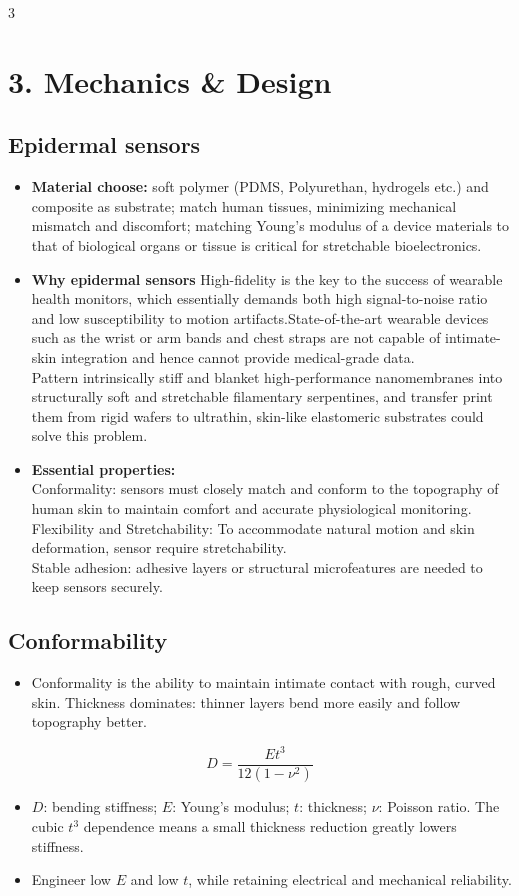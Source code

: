 \documentclass[10pt,a4paper]{ctexart}
\newcommand{\key}[1]{\textbf{#1}}
\newcommand{\formula}[1]{%
  \par\vspace{1pt}\begingroup
  \setlength{\abovedisplayskip}{0pt}\setlength{\belowdisplayskip}{0pt}
  \[#1\]\endgroup\vspace{1pt}}
\begin{document}
\begin{multicols*}{3}
\section{3. Mechanics \& Design}
\subsection{Epidermal sensors}
\begin{itemize}
  \item \key{Material choose:} soft polymer (PDMS, Polyurethan, hydrogels etc.)
  and composite as substrate; match human tissues, minimizing mechanical
  mismatch and discomfort; matching Young's modulus of a device materials to that of 
  biological organs or tissue is critical for stretchable bioelectronics.
  \item \key{Why epidermal sensors} High-fidelity is the key to the success 
  of wearable health monitors, which essentially demands both high signal-to-noise 
  ratio and low susceptibility to motion artifacts.State-of-the-art wearable devices 
  such as the wrist or arm bands and chest straps are not capable of intimate-skin 
  integration and hence cannot provide medical-grade data.\\
  Pattern intrinsically stiff and blanket high-performance nanomembranes into 
  structurally soft and stretchable filamentary serpentines, and transfer print them 
  from rigid wafers to ultrathin, skin-like elastomeric substrates could solve this problem.
  \item \key{Essential properties:}\\
  Conformality: sensors must closely match and conform to the topography of 
  human skin to maintain comfort and accurate physiological monitoring.\\
  Flexibility and Stretchability: To accommodate natural motion and skin 
  deformation, sensor require stretchability.\\
  Stable adhesion: adhesive layers or structural microfeatures are 
  needed to keep sensors securely.
\end{itemize}

\subsection{Conformability}
\begin{itemize}
  \item Conformality is the ability to maintain intimate contact with
  rough, curved skin. Thickness dominates: thinner layers bend more easily
  and follow topography better.
\end{itemize}
\formula{\displaystyle
D=\frac{Et^3}{12(1-\nu^2)}}
\begin{itemize}
  \item $D$: bending stiffness; $E$: Young's modulus; $t$: thickness;
  $\nu$: Poisson ratio. The cubic $t^3$ dependence means a small thickness
  reduction greatly lowers stiffness.
  \item Engineer low $E$ and low $t$, while retaining electrical and
  mechanical reliability.
\end{itemize}


\end{multicols*}
\end{document}
